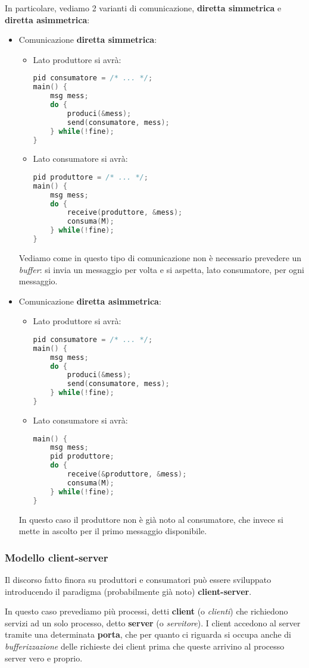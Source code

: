 \documentclass[a4paper,11pt]{article}
\begin{document}
In particolare, vediamo 2 varianti di comunicazione, \textbf{diretta simmetrica} e \textbf{diretta asimmetrica}: 
\begin{itemize}
	\item Comunicazione \textbf{diretta simmetrica}:
\begin{itemize}
	\item Lato produttore si avrà:
\begin{lstlisting}[language=C++, style=codestyle]	
pid consumatore = /* ... */;
main() {
	msg mess;
	do {
		produci(&mess);
		send(consumatore, mess);
	} while(!fine);
}
\end{lstlisting}
	\item Lato consumatore si avrà:
\begin{lstlisting}[language=C++, style=codestyle]	
pid produttore = /* ... */;
main() {
	msg mess;
	do {
		receive(produttore, &mess);
		consuma(M);
	} while(!fine);
}
\end{lstlisting}
\end{itemize}

Vediamo come in questo tipo di comunicazione non è necessario prevedere un \textit{buffer}: si invia un messaggio per volta e si aspetta, lato consumatore, per ogni messaggio.

\item Comunicazione \textbf{diretta asimmetrica}:
\begin{itemize}
	\item Lato produttore si avrà:
\begin{lstlisting}[language=C++, style=codestyle]	
pid consumatore = /* ... */;
main() {
	msg mess;
	do {
		produci(&mess);
		send(consumatore, mess);
	} while(!fine);
}
\end{lstlisting}
	\item Lato consumatore si avrà:
\begin{lstlisting}[language=C++, style=codestyle]	
main() {
	msg mess;
	pid produttore;
	do {
		receive(&produttore, &mess);
		consuma(M);
	} while(!fine);
}
\end{lstlisting}
\end{itemize}

In questo caso il produttore non è già noto al consumatore, che invece si mette in ascolto per il primo messaggio disponibile.

\end{itemize}

\subsubsection{Modello client-server}
Il discorso fatto finora su produttori e consumatori può essere sviluppato introducendo il paradigma (probabilmente già noto) \textbf{client-server}.

In questo caso prevediamo più processi, detti \textbf{client} (o \textit{clienti}) che richiedono servizi ad un solo processo, detto \textbf{server} (o \textit{servitore}).
I client accedono al server tramite una determinata \textbf{porta}, che per quanto ci riguarda si occupa anche di \textit{bufferizzazione} delle richieste dei client prima che queste arrivino al processo server vero e proprio.
\end{document}
